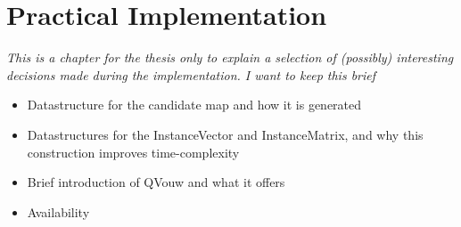 \documentclass[a4paper,notoc,oneside]{tufte-book}
\begin{document}
\chapter{Practical Implementation}

\emph{This is a chapter for the thesis only to explain a selection of (possibly) interesting decisions made during the implementation. I want to keep this brief}
\begin{itemize}
\item Datastructure for the candidate map and how it is generated
\item Datastructures for the InstanceVector and InstanceMatrix, and why this construction improves time-complexity
\item Brief introduction of QVouw and what it offers
\item Availability
\end{itemize}
\end{document}
